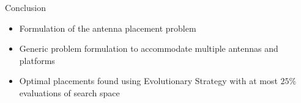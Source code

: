 \documentclass{beamer}
\begin{document}
\begin{frame}{Conclusion}
    \begin{itemize} \itemsep1.5em
        \item Formulation of the antenna placement problem
        \item Generic problem formulation to accommodate multiple antennas and platforms
        \item Optimal placements found using Evolutionary Strategy with at most $25\%$ evaluations of search space
    \end{itemize}
\end{frame}
\end{document}
